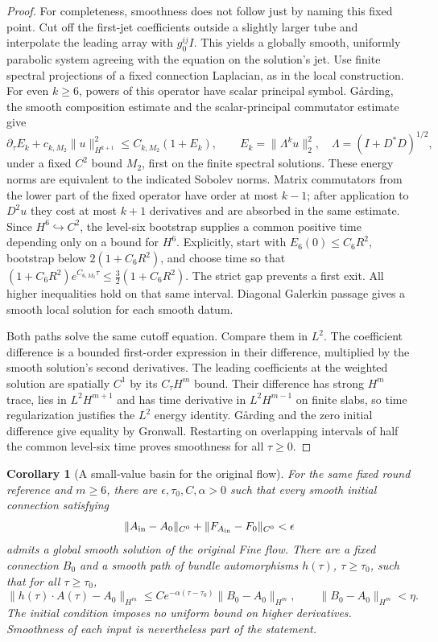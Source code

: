 \documentclass[11pt]{article}
\numberwithin{equation}{section}
\newtheorem{corollary}[theorem]{Corollary}
\theoremstyle{definition}
\theoremstyle{remark}
\begin{document}
\begin{proof}
For completeness, smoothness does not follow just by
naming this fixed point. Cut off the first-jet
coefficients outside a slightly larger tube and
interpolate the leading array with $g_0^{ij}I$.
This yields a globally smooth, uniformly parabolic
system agreeing with the equation on the solution's jet.
Use finite spectral projections of a fixed connection
Laplacian, as in the local construction. For even
$k\ge6$, powers of this operator have scalar principal
symbol. G{\aa}rding, the smooth composition estimate and
the scalar-principal commutator estimate
\cite[Equations (3.1.18)--(3.1.20) and Proposition 3.6.A
of the inspected text]{Taylor1991Nonlinear} give
\[
 \partial_\tau E_k+c_{k,M_2}\|u\|_{H^{k+1}}^2
       \le C_{k,M_2}(1+E_k),
 \qquad E_k=\|\Lambda^ku\|_2^2,\quad
       \Lambda=(I+D^*D)^{1/2},
\]
under a fixed $C^2$ bound $M_2$, first on the finite
spectral solutions. These energy norms are equivalent
to the indicated Sobolev norms. Matrix commutators
from the lower part of the fixed operator have order at
most $k-1$; after application to $D^2u$ they cost at
most $k+1$ derivatives and are absorbed in the same
estimate. Since $H^6\hookrightarrow C^2$, the level-six
bootstrap supplies a common positive time depending
only on a bound for $H^6$. Explicitly, start with
$E_6(0)\le C_6R^2$, bootstrap below
$2(1+C_6R^2)$, and choose time so that
$(1+C_6R^2)e^{C_{6,M_2}\tau}\le
\tfrac32(1+C_6R^2)$. The strict gap prevents a first
exit. All higher inequalities
hold on that same interval. Diagonal Galerkin passage
gives a smooth local solution for each smooth datum.

Both paths solve the same cutoff equation.
Compare them in $L^2$.
The coefficient difference is a bounded first-order
expression in their difference, multiplied by the
smooth solution's second derivatives. The leading
coefficients at the weighted solution are spatially
$C^1$ by its $C_\tau H^m$ bound. Their difference
has strong $H^m$ trace, lies in $L^2H^{m+1}$ and has
time derivative in $L^2H^{m-1}$ on finite slabs, so
time regularization justifies the $L^2$ energy identity.
G{\aa}rding and the zero initial difference give equality
by Gronwall.
Restarting on overlapping intervals of half the common
level-six time proves smoothness for all $\tau\ge0$.
\end{proof}

\begin{corollary}[A small-value basin for the original flow]
\label{cor:round-small-values}
For the same fixed round reference and $m\ge6$, there
are $\epsilon,\tau_0,C,\alpha>0$ such that every
\emph{smooth} initial connection satisfying
\[
 \|A_{\rm in}-A_0\|_{C^0}
       +\|F_{A_{\rm in}}-F_0\|_{C^0}<\epsilon
\]
admits a global smooth solution of the original Fine
flow. There are a fixed connection $B_0$ and a smooth
path of bundle automorphisms $h(\tau)$, $\tau\ge\tau_0$,
such that for all $\tau\ge\tau_0$,
\[
 \|h(\tau)\cdot A(\tau)-A_0\|_{H^m}
 \le Ce^{-\alpha(\tau-\tau_0)}\|B_0-A_0\|_{H^m},
 \qquad \|B_0-A_0\|_{H^m}<\eta.
\]
The initial condition imposes no uniform bound on higher
derivatives. Smoothness of each input is nevertheless
part of the statement.
\end{corollary}
\end{document}
